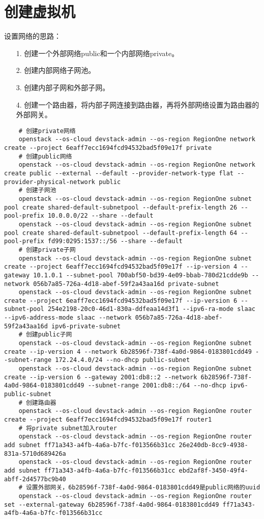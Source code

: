 \documentclass[a4paper,left=1.5cm,right=1.5cm,11pt]{article}
\begin{document}
\section{创建虚拟机}

	设置网络的思路：
	\begin{itemize}
		\item[1.] 创建一个外部网络public和一个内部网络private。
		\item[2.] 创建内部网络子网池。
		\item[3.] 创建内部子网和外部子网。
		\item[4.] 创建一个路由器，将内部子网连接到路由器，再将外部网络设置为路由器的外部网关。
	\end{itemize}

	\begin{lstlisting}
	# 创建private网络
	openstack --os-cloud devstack-admin --os-region RegionOne network create --project 6eaff7ecc1694fcd94532bad5f09e17f private
	# 创建public网络
	openstack --os-cloud devstack-admin --os-region RegionOne network create public --external --default --provider-network-type flat --provider-physical-network public
	# 创建子网池
	openstack --os-cloud devstack-admin --os-region RegionOne subnet pool create shared-default-subnetpool --default-prefix-length 26 --pool-prefix 10.0.0.0/22 --share --default
	openstack --os-cloud devstack-admin --os-region RegionOne subnet pool create shared-default-subnetpool --default-prefix-length 64 --pool-prefix fd99:0295:1537::/56 --share --default
	# 创建private子网
	openstack --os-cloud devstack-admin --os-region RegionOne subnet create --project 6eaff7ecc1694fcd94532bad5f09e17f --ip-version 4 --gateway 10.1.0.1 --subnet-pool 700abf50-bd39-4e09-bbab-780d21cdde9b --network 056b7a85-726a-4d18-abef-59f2a43aa16d private-subnet
	openstack --os-cloud devstack-admin --os-region RegionOne subnet create --project 6eaff7ecc1694fcd94532bad5f09e17f --ip-version 6 --subnet-pool 254e2198-20c0-46d1-830a-ddfeaa14d3f1 --ipv6-ra-mode slaac --ipv6-address-mode slaac --network 056b7a85-726a-4d18-abef-59f2a43aa16d ipv6-private-subnet
	# 创建public子网
	openstack --os-cloud devstack-admin --os-region RegionOne subnet create --ip-version 4 --network 6b28596f-738f-4a0d-9864-0183801cdd49 --subnet-range 172.24.4.0/24 --no-dhcp public-subnet
	openstack --os-cloud devstack-admin --os-region RegionOne subnet create --ip-version 6 --gateway 2001:db8::2 --network 6b28596f-738f-4a0d-9864-0183801cdd49 --subnet-range 2001:db8::/64 --no-dhcp ipv6-public-subnet
	# 创建路由器
	openstack --os-cloud devstack-admin --os-region RegionOne router create --project 6eaff7ecc1694fcd94532bad5f09e17f router1
	# 将private subnet加入router
	openstack --os-cloud devstack-admin --os-region RegionOne router add subnet ff71a343-a4fb-4a6a-b7fc-f013566b31cc 26e240db-8cc9-4938-831a-5710d689426a
	openstack --os-cloud devstack-admin --os-region RegionOne router add subnet ff71a343-a4fb-4a6a-b7fc-f013566b31cc ebd2af8f-3450-49f4-abff-2d4577bc9b40
	# 设置外部网关，6b28596f-738f-4a0d-9864-0183801cdd49是public网络的uuid
	openstack --os-cloud devstack-admin --os-region RegionOne router set --external-gateway 6b28596f-738f-4a0d-9864-0183801cdd49 ff71a343-a4fb-4a6a-b7fc-f013566b31cc
	\end{lstlisting}
\end{document}
